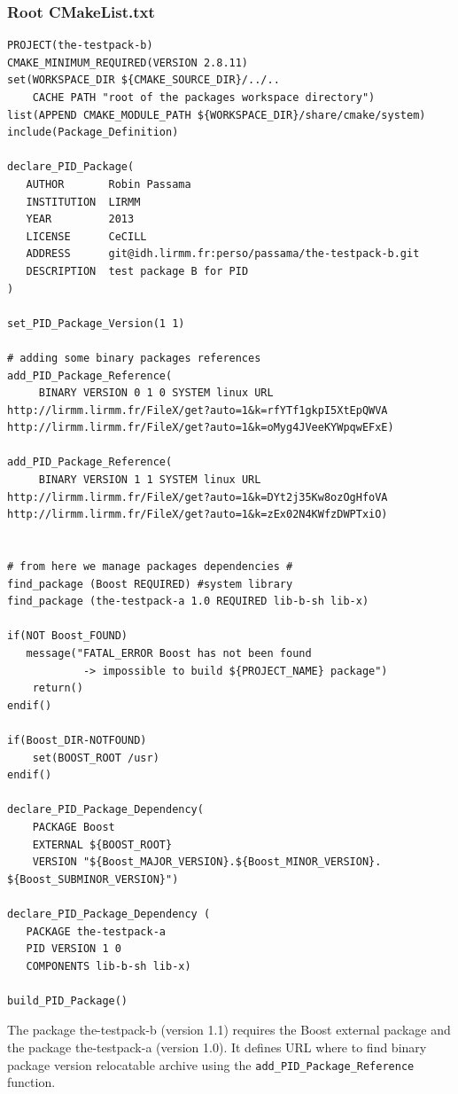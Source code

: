 \documentclass[12pt,a4paper]{article}
\begin{document}
\subsubsection{Root CMakeList.txt}

\begin{verbatim}
PROJECT(the-testpack-b)
CMAKE_MINIMUM_REQUIRED(VERSION 2.8.11)
set(WORKSPACE_DIR ${CMAKE_SOURCE_DIR}/../.. 
	CACHE PATH "root of the packages workspace directory")
list(APPEND CMAKE_MODULE_PATH ${WORKSPACE_DIR}/share/cmake/system)
include(Package_Definition)

declare_PID_Package(	
   AUTHOR       Robin Passama 
   INSTITUTION  LIRMM 
   YEAR         2013 
   LICENSE      CeCILL
   ADDRESS      git@idh.lirmm.fr:perso/passama/the-testpack-b.git
   DESCRIPTION  test package B for PID
)

set_PID_Package_Version(1 1)

# adding some binary packages references
add_PID_Package_Reference(	
     BINARY VERSION 0 1 0 SYSTEM linux URL 	
http://lirmm.lirmm.fr/FileX/get?auto=1&k=rfYTf1gkpI5XtEpQWVA
http://lirmm.lirmm.fr/FileX/get?auto=1&k=oMyg4JVeeKYWpqwEFxE)

add_PID_Package_Reference(
     BINARY VERSION 1 1 SYSTEM linux URL 	
http://lirmm.lirmm.fr/FileX/get?auto=1&k=DYt2j35Kw8ozOgHfoVA
http://lirmm.lirmm.fr/FileX/get?auto=1&k=zEx02N4KWfzDWPTxiO)


# from here we manage packages dependencies #
find_package (Boost REQUIRED) #system library
find_package (the-testpack-a 1.0 REQUIRED lib-b-sh lib-x)

if(NOT Boost_FOUND)
   message("FATAL_ERROR Boost has not been found 
            -> impossible to build ${PROJECT_NAME} package")
	return()
endif()

if(Boost_DIR-NOTFOUND)
	set(BOOST_ROOT /usr)
endif()

declare_PID_Package_Dependency(
    PACKAGE Boost 
    EXTERNAL ${BOOST_ROOT} 
    VERSION "${Boost_MAJOR_VERSION}.${Boost_MINOR_VERSION}.
${Boost_SUBMINOR_VERSION}")

declare_PID_Package_Dependency (
   PACKAGE the-testpack-a
   PID VERSION 1 0 
   COMPONENTS lib-b-sh lib-x)

build_PID_Package()

\end{verbatim}

The package the-testpack-b (version 1.1) requires the Boost external package and the package the-testpack-a (version 1.0). It defines URL where to find binary package version relocatable archive using the \texttt{add\_PID\_Package\_Reference} function.
\end{document}
